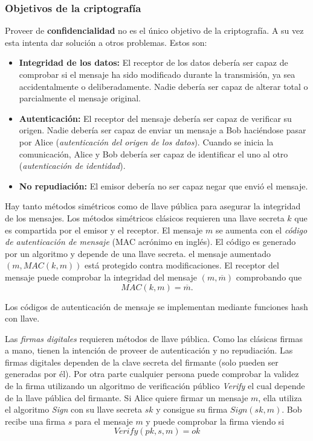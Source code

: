 \documentclass[12pt]{article}
\theoremstyle{definition}
\begin{document}
\subsubsection{Objetivos de la criptografía}

Proveer de \textbf{confidencialidad} no es el único objetivo de la criptografía. A su vez esta intenta dar solución a otros problemas. Estos son:

\begin{itemize}
\item \textbf{Integridad de los datos:} El receptor de los datos debería ser capaz de comprobar si el mensaje ha sido modificado durante la transmisión, ya sea accidentalmente o deliberadamente. Nadie debería ser capaz de alterar total o parcialmente el mensaje original.

\item \textbf{Autenticación:} El receptor del mensaje debería ser capaz de verificar su origen. Nadie debería ser capaz de enviar un mensaje a Bob haciéndose pasar por Alice (\textit{autenticación del origen de los datos}). Cuando se inicia la comunicación, Alice y Bob debería ser capaz de identificar el uno al otro (\textit{autenticación de identidad}).

\item \textbf{No repudiación:} El emisor debería no ser capaz negar que envió el mensaje.
\end{itemize}

Hay tanto métodos simétricos como de llave pública para asegurar la integridad de los mensajes. Los métodos simétricos clásicos requieren una llave secreta $k$ que es compartida por el emisor y el receptor. El mensaje $m$ se aumenta con el \textit{código de autenticación de mensaje} (MAC acrónimo en inglés). El código es generado por un algoritmo y depende de una llave secreta. el mensaje aumentado $(m,MAC(k,m))$ está protegido contra modificaciones. El receptor del mensaje puede comprobar la integridad del mensaje $(m,\overline{m})$ comprobando que
$$MAC(k,m)=\overline{m}.$$

Los códigos de autenticación de mensaje se implementan mediante funciones hash con llave.

Las \textit{firmas digitales} requieren métodos de llave pública. Como las clásicas firmas a mano, tienen la intención de proveer de autenticación y no repudiación. Las firmas digitales dependen de la clave secreta del firmante (solo pueden ser generadas por él). Por otra parte cualquier persona puede comprobar la validez de la firma utilizando un algoritmo de verificación público \textit{Verify} el cual depende de la llave pública del firmante. Si Alice quiere firmar un mensaje $m$, ella utiliza el algoritmo \textit{Sign} con su llave secreta $sk$ y consigue su firma $Sign(sk,m)$. Bob recibe una firma $s$ para el mensaje $m$ y puede comprobar la firma viendo si
$$Verify(pk,s,m)=ok$$
\end{document}

